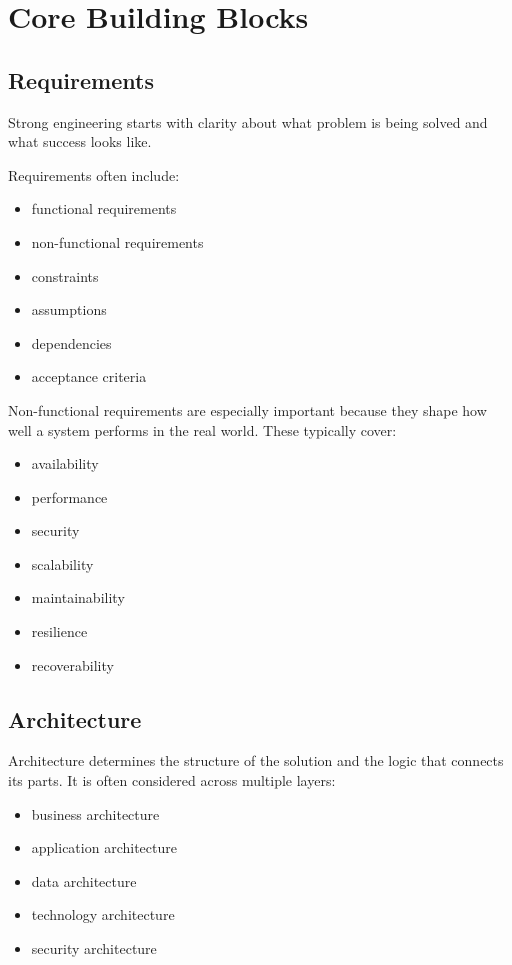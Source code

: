 \documentclass[
  british,
  letterpaper,
  DIV=11,
  numbers=noendperiod]{scrartcl}
\providecommand{\tightlist}{%
  \setlength{\itemsep}{0pt}\setlength{\parskip}{0pt}}
\begin{document}
\section{Core Building Blocks}\label{core-building-blocks}

\subsection{Requirements}\label{requirements}

Strong engineering starts with clarity about what problem is being
solved and what success looks like.

Requirements often include:

\begin{itemize}
\tightlist
\item
  functional requirements
\item
  non-functional requirements
\item
  constraints
\item
  assumptions
\item
  dependencies
\item
  acceptance criteria
\end{itemize}

Non-functional requirements are especially important because they shape
how well a system performs in the real world. These typically cover:

\begin{itemize}
\tightlist
\item
  availability
\item
  performance
\item
  security
\item
  scalability
\item
  maintainability
\item
  resilience
\item
  recoverability
\end{itemize}

\subsection{Architecture}\label{architecture}

Architecture determines the structure of the solution and the logic that
connects its parts. It is often considered across multiple layers:

\begin{itemize}
\tightlist
\item
  business architecture
\item
  application architecture
\item
  data architecture
\item
  technology architecture
\item
  security architecture
\end{itemize}
\end{document}
